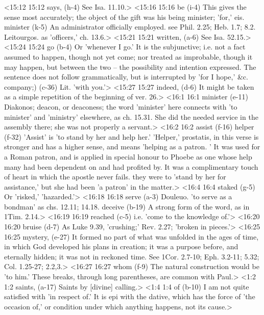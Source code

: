 <15:12 15:12  says, (h-4)  See Isa. 11.10.>
<15:16 15:16  be (i-4)  This gives the sense most accurately; the object of the gift  was his being minister; 'for,' eis.
  minister (k-5)  An administrator officially employed. see Phil. 2.25; Heb.  1.7; 8.2. Leitourgos. as 'officers,' ch. 13.6.>
<15:21 15:21  written, (a-6)  See Isa. 52.15.>
<15:24 15:24  go (b-4)  Or 'whenever I go.' It is the subjunctive; i.e. not a fact  assumed to happen, though not yet come; nor treated as  improbable, though it may happen, but between the two -- the  possibility and intention expressed. The sentence does not  follow grammatically, but is interrupted by 'for I hope,' &c.
  company;) (c-36)  Lit. 'with you.'>
<15:27 15:27  indeed, (d-6)  It might be taken as a simple repetition of the beginning of  ver. 26.>
<16:1 16:1  minister (e-11)  Diakonos; deacon, or deaconess; the word 'minister' here  connects with 'to minister' and 'ministry' elsewhere, as ch. 15.31.  She did the needed service in the assembly there; she  was not properly a servant.>
<16:2 16:2  assist (f-16)  helper (f-32)
  'Assist' is 'to stand by her and help her.' 'Helper,'  prostatis, in this verse is stronger and has a higher sense,  and means 'helping as a patron. ' It was used for a Roman  patron, and is applied in special honour to Phoebe as one whose  help many had been dependent on and had profited by. It was a  complimentary touch of heart in which the apostle never fails.  they were to 'stand by her for assistance,' but she had  been 'a patron' in the matter.>
<16:4 16:4  staked (g-5)  Or 'risked,' 'hazarded.'>
<16:18 16:18  serve (a-3)  Douleuo. 'to serve as a bondman' as chs. 12.11; 14.18.
  deceive (b-19)  A strong form of the word, as in 1Tim. 2.14.>
<16:19 16:19  reached (c-5)  i.e. 'come to the knowledge of.'>
<16:20 16:20  bruise (d-7)  As Luke 9.39, 'crushing;' Rev. 2.27; 'broken in pieces.'>
<16:25 16:25  mystery, (e-27)  It formed no part of what was unfolded in the ages of time,  in which God developed his plans in creation; it was a purpose  before, and eternally hidden; it was not in reckoned time. See 1Cor. 2.7-10; Eph. 3.2-11; 5.32; Col. 1.25-27; 2.2,3.>
<16:27 16:27  whom (f-9)  The natural construction would be 'to him.' These breaks,  through long parentheses, are common with Paul.>
<1:2 1:2  saints, (a-17)  Saints by [divine] calling.>
<1:4 1:4  of (b-10)  I am not quite satisfied with 'in respect of.' It is epi  with the dative, which has the force of 'the occasion of,' or  condition under which anything happens, not its cause.>
